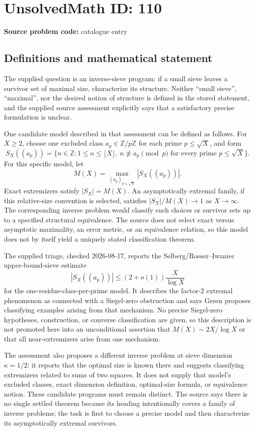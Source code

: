 \documentclass[11pt]{article}
\newcommand{\Z}{\mathbb{Z}}
\begin{document}
\section*{UnsolvedMath ID: 110}
\textbf{Source problem code:} catalogue entry
\subsection{Definitions and mathematical statement}
The supplied question is an inverse-sieve program: if a small sieve leaves a survivor set of maximal size, characterize its structure. Neither ``small sieve'', ``maximal'', nor the desired notion of structure is defined in the stored statement, and the supplied source assessment explicitly says that a satisfactory precise formulation is unclear.

One candidate model described in that assessment can be defined as follows. For $X\geq2$, choose one excluded class $a_p\in\Z/p\Z$ for each prime $p\leq\sqrt X$, and form
\[
S_X((a_p))=\{n\in\Z:1\leq n\leq\lfloor X\rfloor,
\ n\not\equiv a_p\pmod p\text{ for every prime }p\leq\sqrt X\}.
\]
For this specific model, let
\[
M(X)=\max_{(a_p)_{p\leq\sqrt X}}|S_X((a_p))|.
\]
Exact extremizers satisfy $|S_X|=M(X)$. An asymptotically extremal family, if this relative-size convention is selected, satisfies $|S_X|/M(X)\to1$ as $X\to\infty$. The corresponding inverse problem would classify such choices or survivor sets up to a specified structural equivalence. The source does not select exact versus asymptotic maximality, an error metric, or an equivalence relation, so this model does not by itself yield a uniquely stated classification theorem.

The supplied triage, checked 2026-08-17, reports the Selberg/Rosser--Iwaniec upper-bound-sieve estimate
\[
|S_X((a_p))|\leq(2+o(1))\frac{X}{\log X}
\]
for the one-residue-class-per-prime model. It describes the factor-$2$ extremal phenomenon as connected with a Siegel-zero obstruction and says Green proposes classifying examples arising from that mechanism. No precise Siegel-zero hypotheses, construction, or converse classification are given, so this description is not promoted here into an unconditional assertion that $M(X)\sim2X/\log X$ or that all near-extremizers arise from one mechanism.

The assessment also proposes a different inverse problem at sieve dimension $\kappa=1/2$: it reports that the optimal size is known there and suggests classifying extremizers related to sums of two squares. It does not supply that model's excluded classes, exact dimension definition, optimal-size formula, or equivalence notion. These candidate programs must remain distinct. The source says there is no single settled theorem because its heading intentionally covers a family of inverse problems; the task is first to choose a precise model and then characterize its asymptotically extremal survivors.
\end{document}
